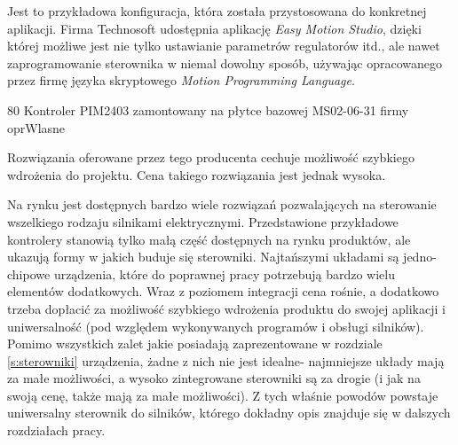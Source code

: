 Jest to przykładowa konfiguracja, która została przystosowana do konkretnej aplikacji. Firma Technosoft udostępnia aplikację {\it Easy Motion Studio}, dzięki której możliwe jest nie tylko ustawianie parametrów regulatorów itd., ale nawet zaprogramowanie sterownika w niemal dowolny sposób, używając opracowanego przez firmę języka skryptowego {\it Motion Programming Language}. 

	{80}
	{Kontroler PIM2403 zamontowany na płytce bazowej MS02-06-31 firmy \firma{}}
	{oprWlasne}

Rozwiązania oferowane przez tego producenta cechuje możliwość szybkiego wdrożenia do projektu. Cena takiego rozwiązania jest jednak wysoka. 


Na rynku jest dostępnych bardzo wiele rozwiązań pozwalających na sterowanie wszelkiego rodzaju silnikami elektrycznymi. Przedstawione przykładowe kontrolery stanowią tylko małą część dostępnych na rynku produktów, ale ukazują formy w jakich buduje się sterowniki. Najtańszymi układami są jedno-chipowe urządzenia, które do poprawnej pracy potrzebują bardzo wielu elementów dodatkowych. Wraz z poziomem integracji cena rośnie, a dodatkowo trzeba dopłacić za możliwość szybkiego wdrożenia produktu do swojej aplikacji i uniwersalność (pod względem wykonywanych programów i obsługi silników). \\

Pomimo wszystkich zalet jakie posiadają zaprezentowane w rozdziale \ref{s:sterowniki} urządzenia, żadne z nich nie jest idealne- najmniejsze układy mają za małe możliwości, a wysoko zintegrowane sterowniki są za drogie (i jak na swoją cenę, także mają za małe możliwości). Z tych właśnie powodów powstaje uniwersalny sterownik do silników, którego dokładny opis znajduje się w dalszych rozdziałach pracy.







\clearpage


